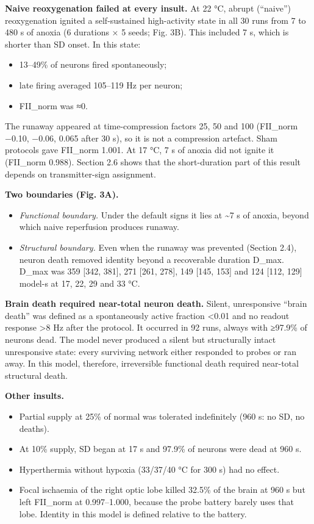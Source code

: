 \documentclass[11pt]{article}
\providecommand{\tightlist}{\setlength{\itemsep}{0pt}\setlength{\parskip}{0pt}}
\begin{document}
\textbf{Naive reoxygenation failed at every insult.} At 22 °C, abrupt (``naive'') reoxygenation ignited a self-sustained high-activity state in all 30 runs from 7 to 480 s of anoxia (6 durations × 5 seeds; Fig. 3B). This included 7 s, which is shorter than SD onset. In this state:

\begin{itemize}
\tightlist
\item
  13--49\% of neurons fired spontaneously;
\item
  late firing averaged 105--119 Hz per neuron;
\item
  FII\_norm was ≈0.
\end{itemize}

The runaway appeared at time-compression factors 25, 50 and 100 (FII\_norm −0.10, −0.06, 0.065 after 30 s), so it is not a compression artefact. Sham protocols gave FII\_norm 1.001. At 17 °C, 7 s of anoxia did not ignite it (FII\_norm 0.988). Section 2.6 shows that the short-duration part of this result depends on transmitter-sign assignment.

\textbf{Two boundaries (Fig. 3A).}

\begin{itemize}
\tightlist
\item
  \emph{Functional boundary.} Under the default signs it lies at \textasciitilde7 s of anoxia, beyond which naive reperfusion produces runaway.
\item
  \emph{Structural boundary.} Even when the runaway was prevented (Section 2.4), neuron death removed identity beyond a recoverable duration D\_max. D\_max was 359 {[}342, 381{]}, 271 {[}261, 278{]}, 149 {[}145, 153{]} and 124 {[}112, 129{]} model-s at 17, 22, 29 and 33 °C.
\end{itemize}

\textbf{Brain death required near-total neuron death.} Silent, unresponsive ``brain death'' was defined as a spontaneously active fraction \textless0.01 and no readout response \textgreater8 Hz after the protocol. It occurred in 92 runs, always with ≥97.9\% of neurons dead. The model never produced a silent but structurally intact unresponsive state: every surviving network either responded to probes or ran away. In this model, therefore, irreversible functional death required near-total structural death.

\textbf{Other insults.}

\begin{itemize}
\tightlist
\item
  Partial supply at 25\% of normal was tolerated indefinitely (960 s: no SD, no deaths).
\item
  At 10\% supply, SD began at 17 s and 97.9\% of neurons were dead at 960 s.
\item
  Hyperthermia without hypoxia (33/37/40 °C for 300 s) had no effect.
\item
  Focal ischaemia of the right optic lobe killed 32.5\% of the brain at 960 s but left FII\_norm at 0.997--1.000, because the probe battery barely uses that lobe. Identity in this model is defined relative to the battery.
\end{itemize}
\end{document}
